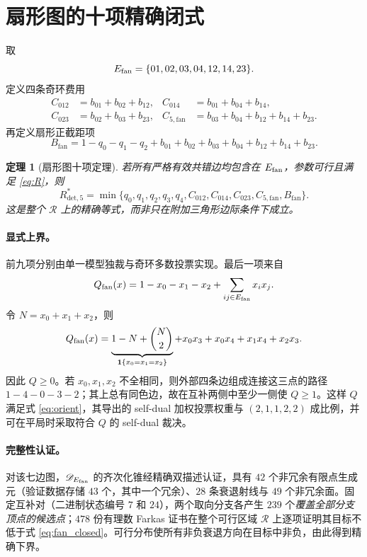 \documentclass[UTF8,11pt,a4paper]{ctexart}
\newtheorem{theorem}{定理}[section]
\newcommand{\Rd}{R_{\mathrm{det},5}^*}
\newcommand{\calR}{\mathcal{R}}
\begin{document}
\section{扇形图的十项精确闭式}
取
\begin{equation}\label{eq:fan}
 E_{\rm fan}=\{01,02,03,04,12,14,23\}.
\end{equation}
定义四条奇环费用
\begin{align*}
 C_{012}&=b_{01}+b_{02}+b_{12},&
 C_{014}&=b_{01}+b_{04}+b_{14},\\
 C_{023}&=b_{02}+b_{03}+b_{23},&
 C_{5,\mathrm{fan}}&=b_{03}+b_{04}+b_{12}+b_{14}+b_{23}.
\end{align*}
再定义扇形正截距项
\begin{equation}\label{eq:Bfan}
 B_{\mathrm{fan}}=1-q_0-q_1-q_2+
 b_{01}+b_{02}+b_{03}+b_{04}+b_{12}+b_{14}+b_{23}.
\end{equation}

\begin{theorem}[扇形图十项定理]\label{thm:fan}
若所有严格有效共错边均包含在 $E_{\rm fan}$，参数可行且满足 \eqref{eq:R}，则
\begin{equation}\label{eq:fan_closed}
\boxed{\Rd=\min\{q_0,q_1,q_2,q_3,q_4,C_{012},C_{014},C_{023},C_{5,\mathrm{fan}},B_{\mathrm{fan}}\}.}
\end{equation}
这是整个 $\calR$ 上的精确等式，而非只在附加三角形边际条件下成立。
\end{theorem}

\paragraph{显式上界。}
前九项分别由单一模型独裁与奇环多数投票实现。最后一项来自
\begin{equation}\label{eq:Qfan}
 Q_{\rm fan}(x)=1-x_0-x_1-x_2+\sum_{ij\in E_{\rm fan}}x_ix_j.
\end{equation}
令 $N=x_0+x_1+x_2$，则
\[
 Q_{\rm fan}(x)=\underbrace{1-N+\binom N2}_{\mathbf1\{x_0=x_1=x_2\}}
 +x_0x_3+x_0x_4+x_1x_4+x_2x_3.
\]
因此 $Q\ge0$。若 $x_0,x_1,x_2$ 不全相同，则外部四条边组成连接这三点的路径 $1-4-0-3-2$；其上总有同色边，故在互补两侧中至少一侧使 $Q\ge1$。这样 $Q$ 满足式 \eqref{eq:orient}，其导出的 self-dual 加权投票权重与 $(2,1,1,2,2)$ 成比例，并可在平局时采取符合 $Q$ 的 self-dual 裁决。

\paragraph{完整性认证。}
对该七边图，$\mathscr D_{E_{\rm fan}}$ 的齐次化锥经精确双描述认证，具有 $42$ 个非冗余有限点生成元（验证数据存储 $43$ 个，其中一个冗余）、$28$ 条衰退射线与 $49$ 个非冗余面。固定互补对（二进制状态编号 $7$ 和 $24$），两个取向分支各产生 $239$ 个\emph{覆盖全部分支顶点的候选点}；$478$ 份有理数 Farkas 证书在整个可行区域 $\calR$ 上逐项证明其目标不低于式 \eqref{eq:fan_closed}。可行分布使所有非负衰退方向在目标中非负，由此得到精确下界。
\end{document}
